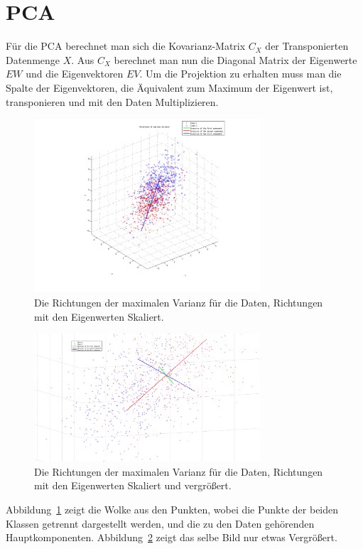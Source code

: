 \section{PCA}

Für die PCA berechnet man sich die Kovarianz-Matrix $C_X$ der Transponierten Datenmenge $X$. Aus $C_X$ berechnet man nun die Diagonal Matrix der Eigenwerte $EW$ und die Eigenvektoren $EV$.
Um die Projektion zu erhalten muss man die Spalte der Eigenvektoren, die Äquivalent zum Maximum der Eigenwert ist, transponieren und mit den Daten Multiplizieren.

\begin{figure}[h!]
  \begin{center}
    \includegraphics[width=0.75\textwidth]{./figures/4_Components}
    \caption{Die Richtungen der maximalen Varianz für die Daten, Richtungen mit den Eigenwerten Skaliert.}
    \label{fig:4_components}
  \end{center}
\end{figure}

\begin{figure}[h!]
  \begin{center}
    \includegraphics[width=0.75\textwidth]{./figures/4_Components_zoom}
    \caption{Die Richtungen der maximalen Varianz für die Daten, Richtungen mit den Eigenwerten Skaliert und vergrößert.}
    \label{fig:4_components_zoom}
  \end{center}
\end{figure}
Abbildung~\ref{fig:4_components} zeigt die Wolke aus den Punkten, wobei die Punkte der beiden Klassen getrennt dargestellt werden, und die zu den Daten gehörenden Hauptkomponenten.
Abbildung~\ref{fig:4_components_zoom} zeigt das selbe Bild nur etwas Vergrößert.\newline
 
